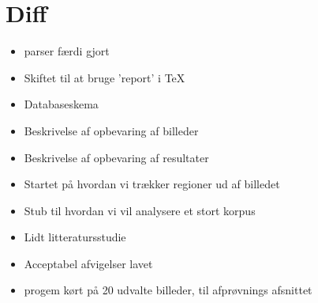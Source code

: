 {
\section*{Diff}
\begin{itemize}
	\item parser færdi gjort
    \item Skiftet til at bruge 'report' i \TeX{}
    \item Databaseskema
    \item Beskrivelse af opbevaring af billeder
    \item Beskrivelse af opbevaring af resultater
    \item Startet på hvordan vi trækker regioner ud af billedet
    \item Stub til hvordan vi vil analysere et stort korpus
	\item Lidt litteratursstudie
	\item Acceptabel afvigelser lavet
	\item progem kørt på 20 udvalte billeder, til afprøvnings afsnittet 
\end{itemize}

}


